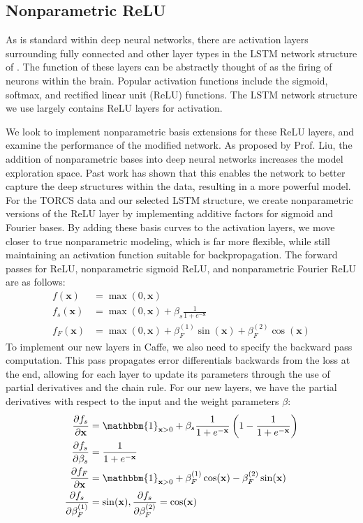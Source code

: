 \documentclass[master]{subfiles}
\begin{document}
\subsection{Nonparametric ReLU}
As is standard within deep neural networks, there are activation layers surrounding fully connected and other layer types in the LSTM network structure of \cite{chenyi_phd}.  The function of these layers can be abstractly thought of as the firing of neurons within the brain.  Popular activation functions include the sigmoid, softmax, and rectified linear unit (ReLU) functions.  The LSTM network structure we use largely contains ReLU layers for activation.\par
We look to implement nonparametric basis extensions for these ReLU layers, and examine the performance of the modified network.  As proposed by Prof. Liu, the addition of nonparametric bases into deep neural networks increases the model exploration space.  Past work has shown that this enables the network to better capture the deep structures within the data, resulting in a more powerful model.  For the TORCS data and our selected LSTM structure, we create nonparametric versions of the ReLU layer by implementing additive factors for sigmoid and Fourier bases.  By adding these basis curves to the activation layers, we move closer to true nonparametric modeling, which is far more flexible, while still maintaining an activation function suitable for backpropagation.  The forward passes for ReLU, nonparametric sigmoid ReLU, and nonparametric Fourier ReLU are as follows:
\begin{align*}
f(\mathbf{x}) &= \max(0, \mathbf{x})\\
f_s(\mathbf{x}) &= \max(0, \mathbf{x}) + \beta_s\frac{1}{1 + e^{-\mathbf{x}}}\\
f_F(\mathbf{x}) &= \max(0, \mathbf{x}) + \beta_F^{(1)}\sin(\mathbf{x}) + \beta_F^{(2)}\cos(\mathbf{x})
\end{align*}
To implement our new layers in Caffe, we also need to specify the backward pass computation.  This pass propagates error differentials backwards from the loss at the end, allowing for each layer to update its parameters through the use of partial derivatives and the chain rule.  For our new layers, we have the partial derivatives with respect to the input and the weight parameters $\beta$:
\begin{align*}
\frac{\partial f_s}{\partial \mathbf{x}} &= \mathbbm{1}_{\mathbf{x} > 0} + \beta_s\frac{1}{1 + e^{-\mathbf{x}}}\left(1 - \frac{1}{1 + e^{-\mathbf{x}}}\right)\\
\frac{\partial f_s}{\partial \beta_s} &= \frac{1}{1 + e^{-\mathbf{x}}}\\
\frac{\partial f_F}{\partial \mathbf{x}} &= \mathbbm{1}_{\mathbf{x} > 0} + \beta_F^{(1)}\cos(\mathbf{x}) - \beta_F^{(2)}\sin(\mathbf{x})\\
\frac{\partial f_s}{\partial \beta_F^{(1)}} &= \sin(\mathbf{x}), \frac{\partial f_s}{\partial \beta_F^{(2)}} = \cos(\mathbf{x})
\end{align*}
\end{document}
